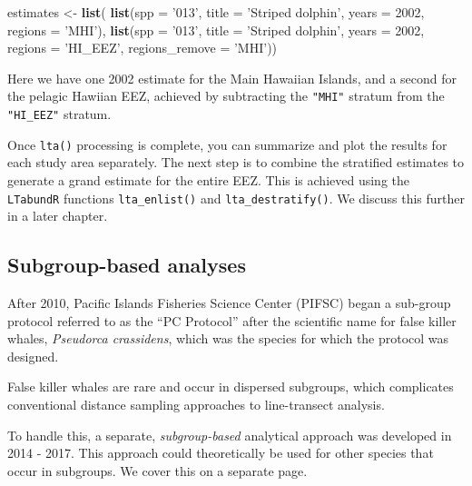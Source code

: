 \documentclass[
]{book}
\newenvironment{Shaded}{\begin{snugshade}}{\end{snugshade}}
\newcommand{\DataTypeTok}[1]{\textcolor[rgb]{0.13,0.29,0.53}{#1}}
\newcommand{\DecValTok}[1]{\textcolor[rgb]{0.00,0.00,0.81}{#1}}
\newcommand{\KeywordTok}[1]{\textcolor[rgb]{0.13,0.29,0.53}{\textbf{#1}}}
\newcommand{\NormalTok}[1]{#1}
\newcommand{\StringTok}[1]{\textcolor[rgb]{0.31,0.60,0.02}{#1}}
\begin{document}
\begin{Shaded}
\begin{Highlighting}[]
\NormalTok{estimates <-}\StringTok{ }\KeywordTok{list}\NormalTok{(}
    \KeywordTok{list}\NormalTok{(}\DataTypeTok{spp =} \StringTok{'013'}\NormalTok{,}
         \DataTypeTok{title =} \StringTok{'Striped dolphin'}\NormalTok{,}
         \DataTypeTok{years =} \DecValTok{2002}\NormalTok{,}
         \DataTypeTok{regions =} \StringTok{'MHI'}\NormalTok{),}
    \KeywordTok{list}\NormalTok{(}\DataTypeTok{spp =} \StringTok{'013'}\NormalTok{,}
         \DataTypeTok{title =} \StringTok{'Striped dolphin'}\NormalTok{,}
         \DataTypeTok{years =} \DecValTok{2002}\NormalTok{,}
         \DataTypeTok{regions =} \StringTok{'HI_EEZ'}\NormalTok{,}
         \DataTypeTok{regions_remove =} \StringTok{'MHI'}\NormalTok{))}
\end{Highlighting}
\end{Shaded}

Here we have one 2002 estimate for the Main Hawaiian Islands, and a second for the pelagic Hawiian EEZ, achieved by subtracting the \texttt{"MHI"} stratum from the \texttt{"HI\_EEZ"} stratum.

Once \texttt{lta()} processing is complete, you can summarize and plot the results for each study area separately. The next step is to combine the stratified estimates to generate a grand estimate for the entire EEZ. This is achieved using the \texttt{LTabundR} functions \texttt{lta\_enlist()} and \texttt{lta\_destratify()}. We discuss this further in a later chapter.

\hypertarget{subgroup-based-analyses}{%
\subsection*{Subgroup-based analyses}\label{subgroup-based-analyses}}

After 2010, Pacific Islands Fisheries Science Center (PIFSC) began a sub-group protocol referred to as the ``PC Protocol'' after the scientific name for false killer whales, \emph{Pseudorca crassidens}, which was the species for which the protocol was designed.

False killer whales are rare and occur in dispersed subgroups, which complicates conventional distance sampling approaches to line-transect analysis.

To handle this, a separate, \emph{subgroup-based} analytical approach was developed in 2014 - 2017. This approach could theoretically be used for other species that occur in subgroups. We cover this on a separate page.
\end{document}
